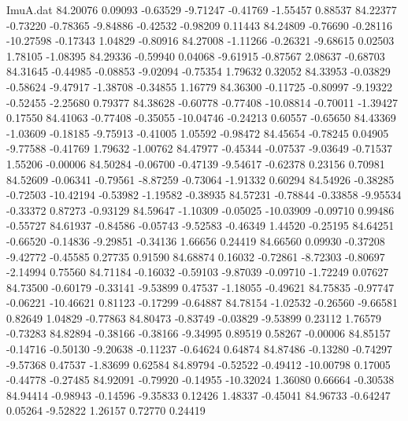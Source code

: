 \begin{filecontents}{ImuA.dat}
  84.20076    0.09093   -0.63529   -9.71247   -0.41769   -1.55457    0.88537
  84.22377   -0.73220   -0.78365   -9.84886   -0.42532   -0.98209    0.11443
  84.24809   -0.76690   -0.28116  -10.27598   -0.17343    1.04829   -0.80916
  84.27008   -1.11266   -0.26321   -9.68615    0.02503    1.78105   -1.08395
  84.29336   -0.59940    0.04068   -9.61915   -0.87567    2.08637   -0.68703
  84.31645   -0.44985   -0.08853   -9.02094   -0.75354    1.79632    0.32052
  84.33953   -0.03829   -0.58624   -9.47917   -1.38708   -0.34855    1.16779
  84.36300   -0.11725   -0.80997   -9.19322   -0.52455   -2.25680    0.79377
  84.38628   -0.60778   -0.77408  -10.08814   -0.70011   -1.39427    0.17550
  84.41063   -0.77408   -0.35055  -10.04746   -0.24213    0.60557   -0.65650
  84.43369   -1.03609   -0.18185   -9.75913   -0.41005    1.05592   -0.98472
  84.45654   -0.78245    0.04905   -9.77588   -0.41769    1.79632   -1.00762
  84.47977   -0.45344   -0.07537   -9.03649   -0.71537    1.55206   -0.00006
  84.50284   -0.06700   -0.47139   -9.54617   -0.62378    0.23156    0.70981
  84.52609   -0.06341   -0.79561   -8.87259   -0.73064   -1.91332    0.60294
  84.54926   -0.38285   -0.72503  -10.42194   -0.53982   -1.19582   -0.38935
  84.57231   -0.78844   -0.33858   -9.95534   -0.33372    0.87273   -0.93129
  84.59647   -1.10309   -0.05025  -10.03909   -0.09710    0.99486   -0.55727
  84.61937   -0.84586   -0.05743   -9.52583   -0.46349    1.44520   -0.25195
  84.64251   -0.66520   -0.14836   -9.29851   -0.34136    1.66656    0.24419
  84.66560    0.09930   -0.37208   -9.42772   -0.45585    0.27735    0.91590
  84.68874    0.16032   -0.72861   -8.72303   -0.80697   -2.14994    0.75560
  84.71184   -0.16032   -0.59103   -9.87039   -0.09710   -1.72249    0.07627
  84.73500   -0.60179   -0.33141   -9.53899    0.47537   -1.18055   -0.49621
  84.75835   -0.97747   -0.06221  -10.46621    0.81123   -0.17299   -0.64887
  84.78154   -1.02532   -0.26560   -9.66581    0.82649    1.04829   -0.77863
  84.80473   -0.83749   -0.03829   -9.53899    0.23112    1.76579   -0.73283
  84.82894   -0.38166   -0.38166   -9.34995    0.89519    0.58267   -0.00006
  84.85157   -0.14716   -0.50130   -9.20638   -0.11237   -0.64624    0.64874
  84.87486   -0.13280   -0.74297   -9.57368    0.47537   -1.83699    0.62584
  84.89794   -0.52522   -0.49412  -10.00798    0.17005   -0.44778   -0.27485
  84.92091   -0.79920   -0.14955  -10.32024    1.36080    0.66664   -0.30538
  84.94414   -0.98943   -0.14596   -9.35833    0.12426    1.48337   -0.45041
  84.96733   -0.64247    0.05264   -9.52822    1.26157    0.72770    0.24419

\end{filecontents}
